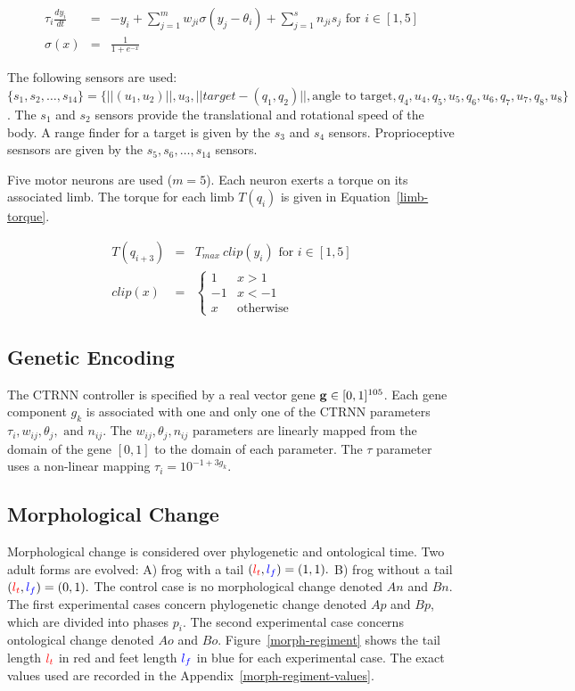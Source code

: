 \begin{eqnarray}
  \tau_i \frac{d y_i}{dt} &=& -y_i + \sum_{j = 1}^m w_{ji} \sigma(y_j - \theta_i) + \sum_{j=1}^s n_{ji} s_j \text{ for } i \in [1,5] \label{ctrnn-eq} \\
  \sigma(x) &=& \frac{1}{1 + e^{-x}}
\end{eqnarray}

The following sensors are used: $\{s_1, s_2, \ldots, s_{14}\} =
\{||(u_1, u_2)||, u_3, ||target - (q_1, q_2)||, \text{angle to
  target}, q_4, u_4, q_5, u_5, q_6, u_6, q_7, u_7, q_8, u_8\}$.  The
$s_1$ and $s_2$ sensors provide the translational and rotational speed
of the body.  A range finder for a target is given by the $s_3$ and
$s_4$ sensors.  Proprioceptive sesnsors are given by the $s_5, s_6,
\ldots, s_{14}$ sensors.

Five motor neurons are used ($m = 5$).  Each neuron exerts a torque on
its associated limb.  The torque for each limb $T(q_i)$ is given in
Equation~\ref{limb-torque}.

\begin{eqnarray}
  T(q_{i + 3}) &=& T_{max}~clip(y_i) \text{ for } i \in [1,5] \label{limb-torque} \\
  clip(x) &=& \begin{cases}
              1 & x > 1 \\
              -1 & x < -1 \\
              x & \text{otherwise} 
              \end{cases}
\end{eqnarray}

\subsection{Genetic Encoding}

The CTRNN controller is specified by a real vector gene $\mathbf{g} \in [0,
  1]^{105}$.  Each gene component $g_k$ is associated with one and
only one of the CTRNN parameters $\tau_i, w_{ij}, \theta_j, \text{ and }
n_{ij}$.  The $w_{ij}, \theta_j, n_{ij}$ parameters are linearly
mapped from the domain of the gene $[0,1]$ to the domain of each
parameter.  The $\tau$ parameter uses a non-linear mapping $\tau_i =
10^{-1 + 3 g_k}$.  

\subsection{Morphological Change}

Morphological change is considered over phylogenetic and ontological
time.  Two adult forms are evolved: A) frog with a tail $(\color{red}l_t\color{black},
\color{blue}l_f\color{black}) = (1,1).$ B) frog without a tail $(\color{red}l_t\color{black}, \color{blue}l_f\color{black}) =
(0,1).$ The control case is no morphological change denoted $An$ and
$Bn$.  The first experimental cases concern phylogenetic change
denoted $Ap$ and $Bp$, which are divided into phases $p_i$.  The
second experimental case concerns ontological change denoted $Ao$ and
$Bo$.  Figure~\ref{morph-regiment} shows the tail length $\color{red}l_t\color{black}$ in
red and feet length $\color{blue}l_f\color{black}$ in blue for each experimental case.
The exact values used are recorded in the
Appendix~\ref{morph-regiment-values}.

